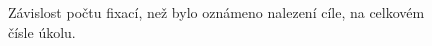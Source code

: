 \begin{center}
\begin{figure}
\centering
\caption{Závislost počtu fixací, než bylo oznámeno nalezení cíle, na celkovém čísle úkolu.}
\end{figure} 


\end{center}

